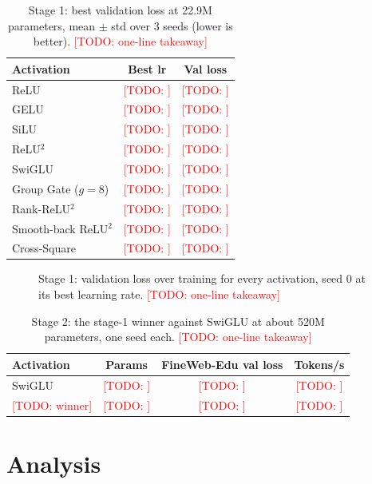 \documentclass{article}
\newcommand{\todo}[1]{\textcolor{red}{[TODO: #1]}}
\begin{document}
\begin{table}
  \caption{Stage 1: best validation loss at 22.9M parameters, mean $\pm$ std over 3 seeds (lower is better). \todo{one-line takeaway}}
  \label{tab:main}
  \centering
  \begin{tabular}{lcc}
    \toprule
    Activation & Best lr & Val loss \\
    \midrule
    ReLU & \todo{} & \todo{} \\
    GELU & \todo{} & \todo{} \\
    SiLU & \todo{} & \todo{} \\
    ReLU$^2$ & \todo{} & \todo{} \\
    SwiGLU & \todo{} & \todo{} \\
    \midrule
    Group Gate ($g = 8$) & \todo{} & \todo{} \\
    Rank-ReLU$^2$ & \todo{} & \todo{} \\
    Smooth-back ReLU$^2$ & \todo{} & \todo{} \\
    Cross-Square & \todo{} & \todo{} \\
    \bottomrule
  \end{tabular}
\end{table}

\begin{figure}
  \centering
  \fbox{\rule[-.5cm]{0cm}{4cm} \rule[-.5cm]{4cm}{0cm}}
  \caption{Stage 1: validation loss over training for every activation, seed 0 at its best learning rate. \todo{one-line takeaway}}
  \label{fig:curves}
\end{figure}

\begin{table}
  \caption{Stage 2: the stage-1 winner against SwiGLU at about 520M parameters, one seed each. \todo{one-line takeaway}}
  \label{tab:scale}
  \centering
  \begin{tabular}{lccc}
    \toprule
    Activation & Params & FineWeb-Edu val loss & Tokens/s \\
    \midrule
    SwiGLU & \todo{} & \todo{} & \todo{} \\
    \todo{winner} & \todo{} & \todo{} & \todo{} \\
    \bottomrule
  \end{tabular}
\end{table}

\section{Analysis}
\label{sec:analysis}
\end{document}
